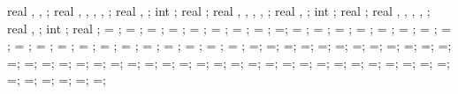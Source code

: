 {{real \botpinx, \botpinspace, \bottomlength;
real \lefttriw, \leftlinew, \leftlined, \leftlinet, \leftradratio;
real \leftxvalue, \leftyvalue;
int \leftshowcircle;
real \leftrotpin;
real \righttriw, \rightlinew, \rightlined, \rightlinet, \rightradratio;
real \rightxvalue, \rightyvalue;
int \rightshowcircle;
real \rightrotpin;
real \bottomtriw, \bottomlinew, \bottomlined, \bottomlinet, \bottomradratio;
real \bottomxvalue, \bottomyvalue;
int \bottomshowcircle;
real \bottomrotpin;
\storyheight = \storyheight;
\baywidth = \baywidth;
\startx = \startx;
\starty = \starty;
\supportwidth = \supportwidth;
\supportheight = \supportheight;
\isolationwidth = \isolationwidth;
\isolationdepth = \isolationdepth;
\isoshift=\isoshift;
\foundationdepth = \foundationdepth;
\linet = \linet;
\beamlinet = \beamlinet;
\collinet = \collinet;
\baselinet = \baselinet;
\isolinet = \isolinet;
\massrad = \massrad;
\foundsidew = \foundsidew;
\leftsoildist = \leftsoildist;
\rightsoildist = \rightsoildist;
\leftsoildepth = \leftsoildepth;
\rightsoildepth = \rightsoildepth;
\soilbelowfound = \soilbelowfound;
\leftcontrolx = \leftcontrolx;
\leftcontroly = \leftcontroly;
\rightcontrolx = \rightcontrolx;
\rightcontroly = \rightcontroly;
\axeslenX = \axeslenX;
\axeslenY = \axeslenY;
\piledepth=\piledepth;
\pilesidespace=\pilesidespace;
\pilediameter=\pilediameter;
\pilelinethickness=\pilelinethickness;
\pblinet=\pblinet;
\latloadshift=\latloadshift;
\toparrlen=\toparrlen;
\basearrlen=\basearrlen;
\drift=\drift;
=;
=;
=;
\engbedrockdepth=\engbedrockdepth;
\engbedrockleftdist=\engbedrockleftdist;
\engbedrockrightdist=\engbedrockrightdist;
\engbedrocklinewidth=\engbedrocklinewidth;
\translayerlinet=\translayerlinet;
\ssinterlinet=\ssinterlinet;
\markssexspace=\markssexspace;
\markssrad=\markssrad;
\marksslinet=\marksslinet;
\supershadespace=\supershadespace;
\shearwalllinet=\shearwalllinet;
\marksuperexspace=\marksuperexspace;
\marksuperrad=\marksuperrad;
\marksuperlinet=\marksuperlinet;
\phorspbtwspr=\phorspbtwspr;
\phorspringspace=\phorspringspace;
\phortextshiftx=\phortextshiftx;
\phortextshifty=\phortextshifty;
\phorsegm=\phorsegm;
\phorsprwid=\phorsprwid;
\phorsprlinethk=\phorsprlinethk;
\phorsuppwidth=\phorsuppwidth;
\phorsuppdepth=\phorsuppdepth;
\phorsupplinethk=\phorsupplinethk;
\pverspringspace=\pverspringspace;
\pvertextshiftx=\pvertextshiftx;
\pvertextshifty=\pvertextshifty;
\pverspringlength=\pverspringlength;
\pverampl=\pverampl;
\pversegm=\pversegm;
\pverspringthk=\pverspringthk;
\pversuppwidth=\pversuppwidth;
}}
